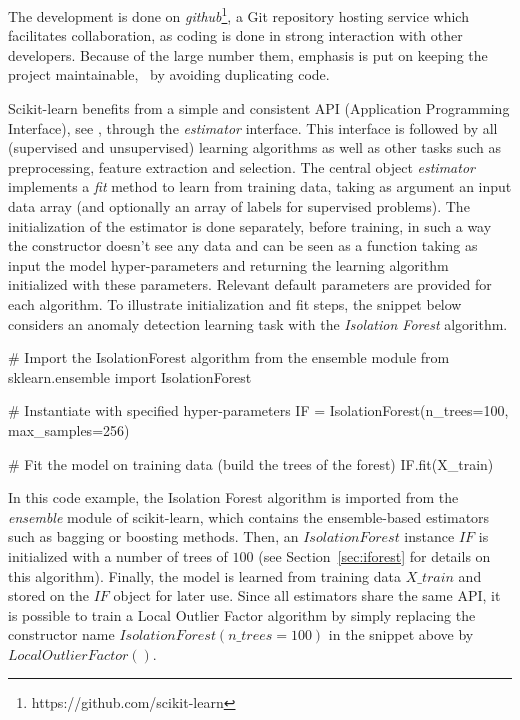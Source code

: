 The development is done on \emph{github}\footnote{https://github.com/scikit-learn}, a Git repository hosting service which facilitates collaboration, as coding is done in strong interaction with other developers. Because of the large number them, emphasis is put on keeping the project maintainable, \eg~by avoiding duplicating code.%


Scikit-learn benefits from a simple and consistent API (Application Programming Interface), see \cite{sklearn_api2013}, through the \emph{estimator} interface. This interface is followed by all (supervised and unsupervised) learning algorithms as well as other tasks such as preprocessing, feature extraction and selection. The central object \emph{estimator} implements a \emph{fit} method to learn from training data, taking as argument an input data array (and optionally an array of labels for supervised problems). The initialization of the estimator is done separately, before training, in such a way the constructor doesn't see any data and can be seen as a function taking as input the model hyper-parameters and returning the learning algorithm initialized with these parameters. Relevant default parameters are provided for each algorithm. To illustrate initialization and fit steps, the snippet below considers an anomaly detection learning task with the \emph{Isolation Forest} algorithm.

\begin{pythoncode} 
# Import the IsolationForest algorithm from the ensemble module
from sklearn.ensemble import IsolationForest

# Instantiate with specified hyper-parameters
IF = IsolationForest(n_trees=100, max_samples=256)

# Fit the model on training data (build the trees of the forest)
IF.fit(X_train)
\end{pythoncode}


In this code example, the Isolation Forest algorithm is imported from the \emph{ensemble} module of scikit-learn, which contains the ensemble-based estimators such as bagging or boosting methods. Then, an $IsolationForest$ instance $IF$ is initialized with a number of trees of $100$ (see Section~\ref{sec:iforest} for details on this algorithm). Finally, the model is learned from training data $X\_train$ and stored on the $IF$ object for later use. Since all estimators share the same API, it is possible to train a Local Outlier Factor algorithm by simply replacing the constructor name $IsolationForest(n\_trees=100)$ in the snippet above by $LocalOutlierFactor()$.

